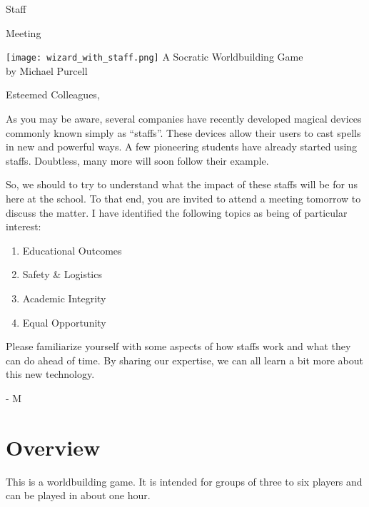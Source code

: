 \documentclass[a6paper, 11pt, parskip=half]{scrartcl}
\begin{document}
\begin{titlepage}
\enlargethispage{4.75\baselineskip}
\setmainfont[Scale=3.25]{Magic School One}
\Huge
\begin{center}
\vspace*{-1.0\baselineskip}
Staff

Meeting

\vfill
\texttt{[image: wizard\_with\_staff.png]}
\vfill
\huge
\setmainfont{Bilbo Swash Caps}
A Socratic Worldbuilding Game\\
\setmainfont{Bilbo Swash Caps}
by Michael Purcell
\end{center}
\end{titlepage}
\thispagestyle{empty}
\setmainfont{Bilbo Swash Caps}
\noindent Esteemed Colleagues,

As you may be aware, several companies have recently developed magical devices commonly known simply as ``staffs''.
These devices allow their users to cast spells in new and powerful ways. 
A few pioneering students have already started using staffs.
Doubtless, many more will soon follow their example.

So, we should to try to understand what the impact of these staffs will be for us here at the school.
To that end, you are invited to attend a meeting tomorrow to discuss the matter.
I have identified the following topics as being of particular interest:
\begin{enumerate}[nosep]
	\item Educational Outcomes
	\item Safety \& Logistics
	\item Academic Integrity
	\item Equal Opportunity
\end{enumerate}   

Please familiarize yourself with some aspects of how staffs work and what they can do ahead of time.
By sharing our expertise, we can all learn a bit more about this new technology.

\noindent - M
\setmainfont{Cochin}

\newpage
\setmainfont{Cochin}
\section*{Overview}
This is a worldbuilding game. It is intended for groups of three to six players and can be played in about one hour.
\end{document}
